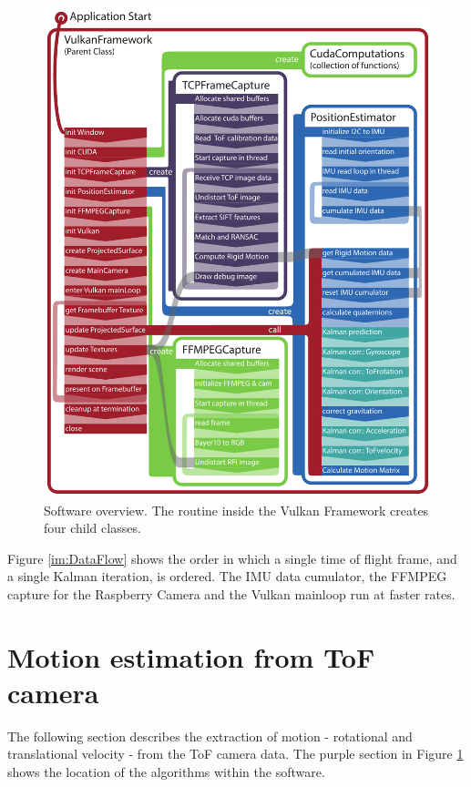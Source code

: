 \begin{figure}[H]
    \centering
    \includegraphics[width=1.0\textwidth]{images/SoftwareArchitecture.pdf}
    \caption{Software overview. The routine inside the Vulkan Framework creates four child classes.}
    \label{fig:sw_concept}
\end{figure}
Figure \ref{im:DataFlow} shows the order in which a single time of flight frame, and a single Kalman iteration, is ordered. The IMU data cumulator, the FFMPEG capture for the Raspberry Camera and the Vulkan mainloop run at faster rates. 
\section{Motion estimation from ToF camera}
The following section describes the extraction of motion - rotational and translational velocity - from the ToF camera data. The purple section in Figure \ref{fig:sw_concept} shows the location of the algorithms within the software.
